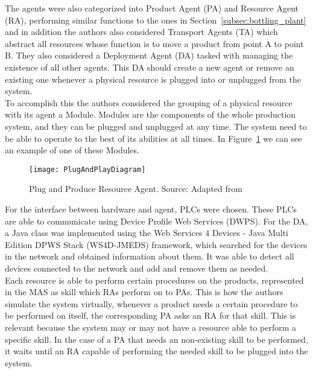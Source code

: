The agents were also categorized into Product Agent (PA) and Resource Agent (RA), performing similar functions to the ones in Section~\ref{subsec:bottling_plant} and in addition the authors also considered Transport Agents (TA) which abstract all resources whose function is to move a product from point A to point B. They also considered a Deployment Agent (DA) tasked with managing the existence of all other agents. This DA should create a new agent or remove an existing one whenever a physical resource is plugged into or unplugged from the system.\\

To accomplish this the authors considered the grouping of a physical resource with its agent a Module. Modules are the components of the whole production system, and they can be plugged and unplugged at any time. The system need to be able to operate to the best of its abilities at all times. In Figure~\ref{fig:plug_and_play_device_architecture} we can see an example of one of these Modules.\\

\begin{figure}[hbt!]
	\centering
	\texttt{[image: PlugAndPlayDiagram]}
	\caption{Plug and Produce Resource Agent. Source: Adapted from \cite{8972169}}
	\label{fig:plug_and_play_device_architecture}
\end{figure}

For the interface between hardware and agent, PLCs were chosen. These PLCs are able to communicate using Device Profile Web Services (DWPS). For the DA, a Java class was implemented using the Web Services 4 Devices - Java Multi Edition DPWS Stack (WS4D-JMEDS) framework, which searched for the devices in the network and obtained information about them. It was able to detect all devices connected to the network and add and remove them as needed.\\

Each resource is able to perform certain procedures on the products, represented in the MAS as skill which RAs perform on to PAs. This is how the authors simulate the system virtually, whenever a product needs a certain procedure to be performed on itself, the corresponding PA asks an RA for that skill. This is relevant because the system may or may not have a resource able to perform a specific skill. In the case of a PA that needs an non-existing skill to be performed, it waits until an RA capable of performing the needed skill to be plugged into the system.\\

